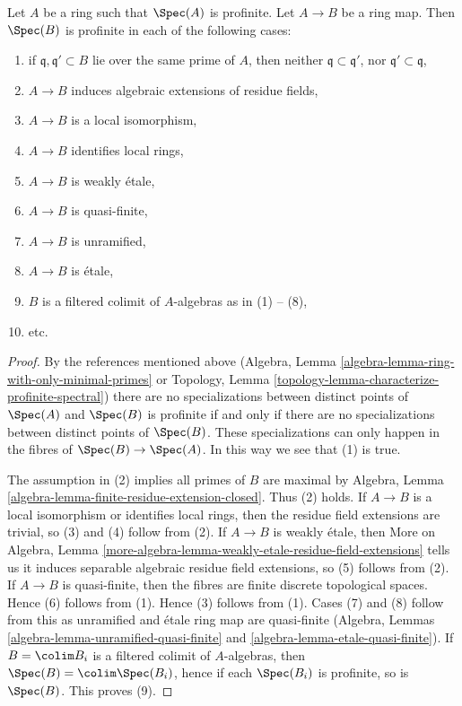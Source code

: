 \begin{lemma}
\label{lemma-profinite-goes-up}
Let $A$ be a ring such that $\Spec(A)$ is profinite. Let $A \to B$ be a
ring map. Then $\Spec(B)$ is profinite in each of the following cases:
\begin{enumerate}
\item if $\mathfrak q,\mathfrak q' \subset B$ lie over the same
prime of $A$, then neither $\mathfrak q \subset \mathfrak q'$, nor
$\mathfrak q' \subset \mathfrak q$,
\item $A \to B$ induces algebraic extensions of residue fields,
\item $A \to B$ is a local isomorphism,
\item $A \to B$ identifies local rings,
\item $A \to B$ is weakly \'etale,
\item $A \to B$ is quasi-finite,
\item $A \to B$ is unramified,
\item $A \to B$ is \'etale,
\item $B$ is a filtered colimit of $A$-algebras as in (1) -- (8),
\item etc.
\end{enumerate}
\end{lemma}

\begin{proof}
By the references mentioned above
(Algebra, Lemma \ref{algebra-lemma-ring-with-only-minimal-primes} or
Topology, Lemma \ref{topology-lemma-characterize-profinite-spectral})
there are no specializations between distinct points of $\Spec(A)$ and
$\Spec(B)$ is profinite if and only if there are no specializations
between distinct points of $\Spec(B)$. These specializations can only
happen in the fibres of $\Spec(B) \to \Spec(A)$. In this way we see
that (1) is true.

\medskip\noindent
The assumption in (2) implies all primes of $B$ are maximal by
Algebra, Lemma \ref{algebra-lemma-finite-residue-extension-closed}.
Thus (2) holds.
If $A \to B$ is a local isomorphism or identifies local rings,
then the residue field extensions are trivial, so (3) and (4)
follow from (2).
If $A \to B$ is weakly \'etale, then More on Algebra, Lemma
\ref{more-algebra-lemma-weakly-etale-residue-field-extensions}
tells us it induces separable algebraic residue field extensions, so
(5) follows from (2).
If $A \to B$ is quasi-finite, then the fibres are finite discrete
topological spaces. Hence (6) follows from (1).
Hence (3) follows from (1). Cases (7) and (8)
follow from this as unramified and \'etale ring map are quasi-finite
(Algebra, Lemmas
\ref{algebra-lemma-unramified-quasi-finite} and
\ref{algebra-lemma-etale-quasi-finite}).
If $B = \colim B_i$ is a filtered colimit of $A$-algebras, then
$\Spec(B) = \colim \Spec(B_i)$, hence if each $\Spec(B_i)$
is profinite, so is $\Spec(B)$. This proves (9).
\end{proof}

